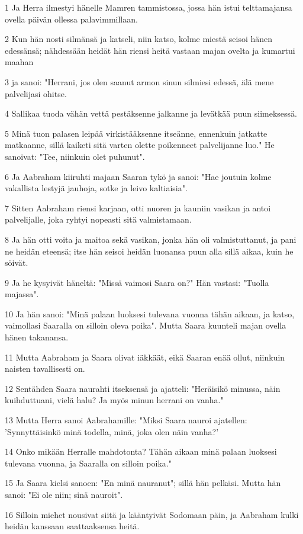 \par 1 Ja Herra ilmestyi hänelle Mamren tammistossa, jossa hän istui telttamajansa ovella päivän ollessa palavimmillaan.
\par 2 Kun hän nosti silmänsä ja katseli, niin katso, kolme miestä seisoi hänen edessänsä; nähdessään heidät hän riensi heitä vastaan majan ovelta ja kumartui maahan
\par 3 ja sanoi: "Herrani, jos olen saanut armon sinun silmiesi edessä, älä mene palvelijasi ohitse.
\par 4 Sallikaa tuoda vähän vettä pestäksenne jalkanne ja levätkää puun siimeksessä.
\par 5 Minä tuon palasen leipää virkistääksenne itseänne, ennenkuin jatkatte matkaanne, sillä kaiketi sitä varten olette poikenneet palvelijanne luo." He sanoivat: "Tee, niinkuin olet puhunut".
\par 6 Ja Aabraham kiiruhti majaan Saaran tykö ja sanoi: "Hae joutuin kolme vakallista lestyjä jauhoja, sotke ja leivo kaltiaisia".
\par 7 Sitten Aabraham riensi karjaan, otti nuoren ja kauniin vasikan ja antoi palvelijalle, joka ryhtyi nopeasti sitä valmistamaan.
\par 8 Ja hän otti voita ja maitoa sekä vasikan, jonka hän oli valmistuttanut, ja pani ne heidän eteensä; itse hän seisoi heidän luonansa puun alla sillä aikaa, kuin he söivät.
\par 9 Ja he kysyivät häneltä: "Missä vaimosi Saara on?" Hän vastasi: "Tuolla majassa".
\par 10 Ja hän sanoi: "Minä palaan luoksesi tulevana vuonna tähän aikaan, ja katso, vaimollasi Saaralla on silloin oleva poika". Mutta Saara kuunteli majan ovella hänen takanansa.
\par 11 Mutta Aabraham ja Saara olivat iäkkäät, eikä Saaran enää ollut, niinkuin naisten tavallisesti on.
\par 12 Sentähden Saara naurahti itseksensä ja ajatteli: "Heräisikö minussa, näin kuihduttuani, vielä halu? Ja myös minun herrani on vanha."
\par 13 Mutta Herra sanoi Aabrahamille: "Miksi Saara nauroi ajatellen: 'Synnyttäisinkö minä todella, minä, joka olen näin vanha?'
\par 14 Onko mikään Herralle mahdotonta? Tähän aikaan minä palaan luoksesi tulevana vuonna, ja Saaralla on silloin poika."
\par 15 Ja Saara kielsi sanoen: "En minä nauranut"; sillä hän pelkäsi. Mutta hän sanoi: "Ei ole niin; sinä nauroit".
\par 16 Silloin miehet nousivat siitä ja kääntyivät Sodomaan päin, ja Aabraham kulki heidän kanssaan saattaaksensa heitä.
